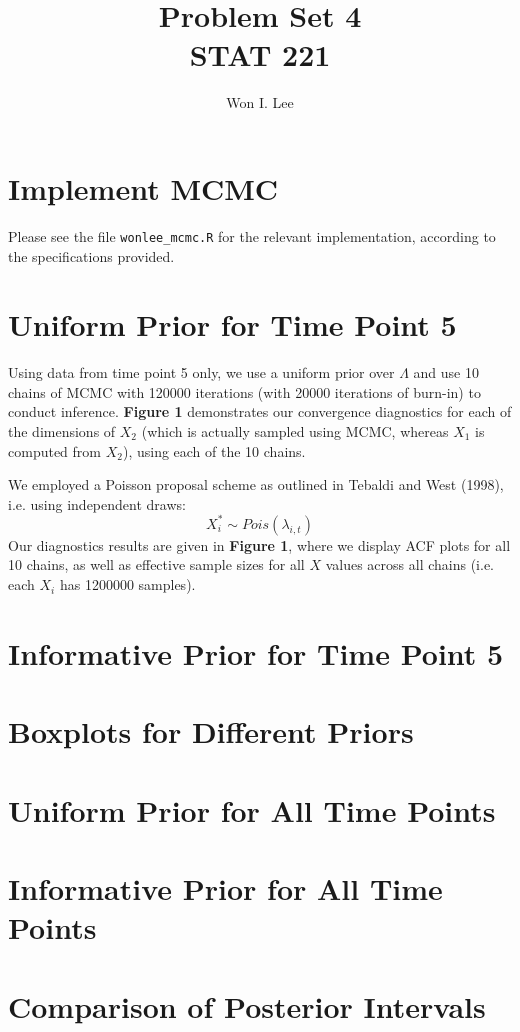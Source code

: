 \documentclass[psamsfonts]{amsart}
\title{Problem Set 4 \\ STAT 221}
\author{Won I. Lee}
\theoremstyle{definition}
\theoremstyle{remark}
\numberwithin{equation}{section}
\begin{document}
	
\maketitle

\section{Implement MCMC}

Please see the file \texttt{wonlee\_mcmc.R} for the relevant implementation, according to the specifications provided.

\section{Uniform Prior for Time Point 5}

Using data from time point 5 only, we use a uniform prior over $\Lambda$ and use 10 chains of MCMC with 120000 iterations (with 20000 iterations of burn-in) to conduct inference. {\bf Figure 1} demonstrates our convergence diagnostics for each of the dimensions of $X_2$ (which is actually sampled using MCMC, whereas $X_1$ is computed from $X_2$), using each of the 10 chains.

We employed a Poisson proposal scheme as outlined in Tebaldi and West (1998), i.e. using independent draws:
$$X_i^* \sim Pois(\lambda_{i,t})$$
Our diagnostics results are given in {\bf Figure 1}, where we display ACF plots for all 10 chains, as well as effective sample sizes for all $X$ values across all chains (i.e. each $X_i$ has 1200000 samples).

\section{Informative Prior for Time Point 5}

\section{Boxplots for Different Priors}

\section{Uniform Prior for All Time Points}

\section{Informative Prior for All Time Points}

\section{Comparison of Posterior Intervals}
\end{document}
